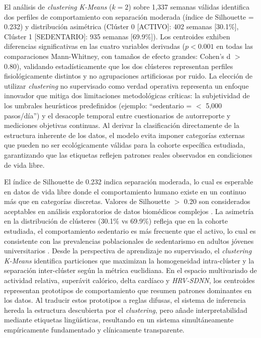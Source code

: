 El análisis de \textit{clustering} \textit{K-Means} ($k=2$) sobre 1,337 semanas válidas identifica dos perfiles de comportamiento con separación moderada (índice de Silhouette = 0.232) y distribución asimétrica (Clúster 0 [ACTIVO]: 402 semanas [30.1\%], Clúster 1 [SEDENTARIO]: 935 semanas [69.9\%]). Los centroides exhiben diferencias significativas en las cuatro variables derivadas ($p < 0.001$ en todas las comparaciones Mann-Whitney, con tamaños de efecto grandes: Cohen's d $>$ 0.80), validando estadísticamente que los dos clústeres representan perfiles fisiológicamente distintos y no agrupaciones artificiosas por ruido. La elección de utilizar \textit{clustering} no supervisado como verdad operativa representa un enfoque innovador que mitiga dos limitaciones metodológicas críticas: la subjetividad de los umbrales heurísticos predefinidos (ejemplo: ``sedentario = $<$ 5,000 pasos/día'') y el desacople temporal entre cuestionarios de autorreporte y mediciones objetivas continuas. Al derivar la clasificación directamente de la estructura inherente de los datos, el modelo evita imponer categorías externas que pueden no ser ecológicamente válidas para la cohorte específica estudiada, garantizando que las etiquetas reflejen patrones reales observados en condiciones de vida libre.

El índice de Silhouette de 0.232 indica separación moderada, lo cual es esperable en datos de vida libre donde el comportamiento humano existe en un continuo más que en categorías discretas. Valores de Silhouette $>$ 0.20 son considerados aceptables en análisis exploratorios de datos biomédicos complejos \cite{Rousseeuw1987Silhouettes}. La asimetría en la distribución de clústeres (30.1\% vs 69.9\%) refleja que en la cohorte estudiada, el comportamiento sedentario es más frecuente que el activo, lo cual es consistente con las prevalencias poblacionales de sedentarismo en adultos jóvenes universitarios \cite{Shamah-Levy2023ENSANUT}. Desde la perspectiva de aprendizaje no supervisado, el \textit{clustering} \textit{K-Means} identifica particiones que maximizan la homogeneidad intra-clúster y la separación inter-clúster según la métrica euclidiana. En el espacio multivariado de actividad relativa, superávit calórico, delta cardíaco y \textit{HRV-SDNN}, los centroides representan prototipos de comportamiento que resumen patrones dominantes en los datos. Al traducir estos prototipos a reglas difusas, el sistema de inferencia hereda la estructura descubierta por el \textit{clustering}, pero añade interpretabilidad mediante etiquetas lingüísticas, resultando en un sistema simultáneamente empíricamente fundamentado y clínicamente transparente.

